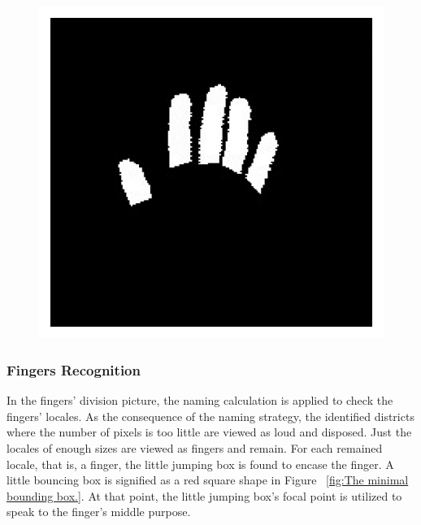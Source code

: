 \documentclass[a4paper]{article}
\begin{document}
\begin{figure}[h!]
\begin{center}
\includegraphics[scale=1.5]{Fig8}
\label{fig:The segmented fingers.}
\end{center}
\end{figure}

\subsubsection{Fingers Recognition}
In the fingers' division picture, the naming calculation is applied to check the fingers' locales. As the consequence of the naming strategy, the identified districts where the number of pixels is too little are viewed as loud and disposed. Just the locales of enough sizes are viewed as fingers and remain. For each remained locale, that is, a finger, the little jumping box is found to encase the finger. A little bouncing box is signified as a red square shape in Figure ~\ref{fig:The minimal bounding box.}. At that point, the little jumping box's focal point is utilized to speak to the finger's middle purpose.
\end{document}
